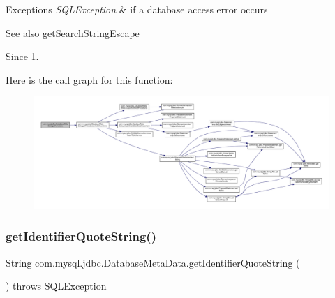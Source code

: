 \begin{DoxyExceptions}{Exceptions}
{\em S\+Q\+L\+Exception} & if a database access error occurs \\
\hline
\end{DoxyExceptions}
\begin{DoxySeeAlso}{See also}
\mbox{\hyperlink{classcom_1_1mysql_1_1jdbc_1_1_database_meta_data_a210b7942557a965c3af550074bb6fe9d}{get\+Search\+String\+Escape}} 
\end{DoxySeeAlso}
\begin{DoxySince}{Since}
1. 
\end{DoxySince}
Here is the call graph for this function\+:\nopagebreak
\begin{figure}[H]
\begin{center}
\leavevmode
\includegraphics[width=350pt]{classcom_1_1mysql_1_1jdbc_1_1_database_meta_data_a01609207bf0f104ae316e507c1250ec5_cgraph}
\end{center}
\end{figure}
\mbox{\label{classcom_1_1mysql_1_1jdbc_1_1_database_meta_data_a1a0f564a2d0f6c011143f31f9a0128ef}} 
\subsubsection{\texorpdfstring{get\+Identifier\+Quote\+String()}{getIdentifierQuoteString()}}
{\footnotesize\ttfamily String com.\+mysql.\+jdbc.\+Database\+Meta\+Data.\+get\+Identifier\+Quote\+String (\begin{DoxyParamCaption}{ }\end{DoxyParamCaption}) throws S\+Q\+L\+Exception}

